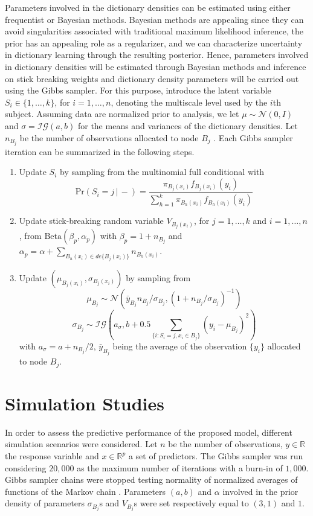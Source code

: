 \documentclass{article}
\newcommand{\Real}{\mathbb{R}}
\providecommand{\mc}[1]{\mathcal{#1}}
\begin{document}
Parameters involved in the dictionary densities can be estimated using either frequentist or Bayesian methods. Bayesian methods are appealing since they can avoid singularities associated with traditional maximum likelihood inference, the prior has an appealing role as a regularizer, and we can characterize uncertainty in dictionary learning through the resulting posterior.
Hence, parameters involved in dictionary densities will be estimated through Bayesian methods and inference on stick breaking weights and dictionary density parameters will be carried out using the Gibbs sampler. For this purpose, introduce the latent variable $S_i \in \{1,\ldots,k\}$, for $i=1,\ldots,n$, denoting the multiscale level used by the $i$th subject.  Assuming data are normalized prior to analysis, we let $\mu \sim \mc{N}(0,I)$ and $\sigma=\mc{IG}(a,b)$ for the means and variances of the dictionary densities. Let $n_{B_j}$ be  the number of observations allocated to node $B_j$ . Each Gibbs sampler iteration can be summarized in the following steps.
\begin{enumerate}
\item Update $S_i$ by sampling from the multinomial full conditional with 
\[\mbox{Pr}( S_i = j\, |\, -) = \frac{ \pi_{B_j(x_i)}f_{B_j(x_i)}(y_i) }{ \sum_{h=1}^k \pi_{B_h(x_i)}f_{B_h(x_i)}(y_i) } \label{eq:prS}\]
\item Update stick-breaking random variable $V_{B_j(x_i)}$, for $j=1, \ldots, k$ and $i=1, \ldots, n$, from $\mbox{Beta}(\beta_p,\alpha_p)$ with $\beta_p=1+n_{B_j}$ and $\alpha_p=\alpha+\sum_{B_h(x_i) \in de\{B_j(x_i)\}} n_{B_h(x_i)}$.
\item Update $(\mu_{B_j(x_i)},\sigma_{B_j(x_i)})$ by sampling from
\[  \mu_{B_j} \sim \mc{N}\left(\bar{y}_{B_j} n_{B_j}/\sigma_{B_j},(1+n_{B_j}/\sigma_{B_j})^{-1}\right)\]
\[ \sigma_{B_j} \sim \mc{IG}\left(a_{\sigma},b+0.5\sum_{\{i: S_i=j,x_i \in B_j\}} \left(y_{i}-\mu_{B_j}\right)^2\right)\]
with $a_{\sigma}=a+n_{B_j}/2$, $\bar{y}_{B_j}$ being the average of the observation $\{y_i\}$ allocated to node $B_j$.

\end{enumerate}



\section{Simulation Studies}
In order to assess the predictive performance of the proposed model, different simulation scenarios were considered. Let $n$ be the number of observations, $y \in \Real$ the response variable and $x \in \Real^p$ a set of predictors. The Gibbs sampler was run considering $20,000$ as the maximum number of iterations with a burn-in of $1,000$. Gibbs sampler chains were stopped testing normality of normalized averages of functions of the Markov chain \cite{Chauveau98anautomated}. Parameters $(a,b)$ and $\alpha$ involved in the prior density of parameters $\sigma_{B_j}$s and $V_{B_j}$s were set respectively equal to $(3,1)$ and $1$.
\end{document}
